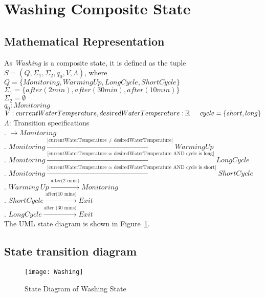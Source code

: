 \newpage
\section{Washing Composite State}

\subsection{Mathematical Representation}

\noindent As \textit{Washing} is a composite state, it is defined as the tuple $S = (Q, \Sigma_1, \Sigma_2, q_0, V, \Lambda)$, where\\

\noindent $Q = \{Monitoring, Warming Up, Long Cycle, Short Cycle\}$\\
\noindent $\Sigma_1 = \{after(2min), after(30min), after(10min)\}$\\
\noindent $\Sigma_2 = \emptyset$\\
\noindent $q_0: Monitoring$\\
\noindent $V: currentWaterTemperature, desiredWaterTemperature: \mathbb{R} \\
\indent cycle = \{short, long\}$\\
\noindent $\Lambda$: Transition specifications\\
. $\rightarrow Monitoring$\\
. $Monitoring \xrightarrow {\text {[currentWaterTemperature $\neq$ desiredWaterTemperature]}} Warming Up$\\
. $Monitoring \xrightarrow {\text {[currentWaterTemperature $\approx$ desiredWaterTemperature AND cycle is long]}} Long Cycle$\\
. $Monitoring \xrightarrow {\text {[currentWaterTemperature $\approx$ desiredWaterTemperature AND cycle is short]}} Short Cycle$\\
. $Warming~Up \xrightarrow {\text {after(2 mins)}} Monitoring$\\
. $Short Cycle \xrightarrow {\text {after(10 mins)}} Exit$\\
. $Long Cycle \xrightarrow {\text {after (30 mins)}} Exit$\\

\noindent The UML state diagram is shown in Figure~\ref{fig:Washing}.

\newpage

\subsection{State transition diagram}

\begin{figure}[h!]
	\centering
		\texttt{[image: Washing]}
		  \caption{State Diagram of Washing State}
  \label{fig:Washing}
\end{figure}
